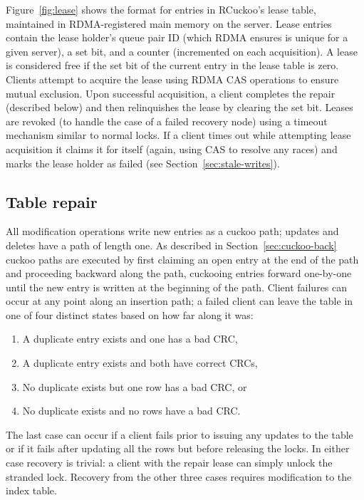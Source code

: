Figure~\ref{fig:lease} shows the format for entries in
RCuckoo's lease table, maintained in RDMA-registered main memory on
the server.  Lease entries contain the lease holder's queue pair ID
(which RDMA ensures is unique for a given server), a set bit, and a
counter (incremented on each acquisition).  A lease is considered free
if the set bit of the current entry in the lease table is zero.
Clients attempt to acquire the lease using RDMA CAS operations to
ensure mutual exclusion.
Upon successful acquisition, a client completes the repair (described
below) and then relinquishes the lease by clearing the set bit.
Leases are revoked (to handle the case of a failed recovery node)
using a timeout mechanism similar to normal locks.  If a client times
out while attempting lease acquisition it claims it for itself (again,
using CAS to resolve any races) and marks the lease holder as failed
(see Section~\ref{sec:stale-writes}).


\subsection{Table repair} 
\label{sec:table-repair}


All modification operations write new entries as a cuckoo path;
updates and deletes have a path of length one.  As described in
Section~\ref{sec:cuckoo-back} cuckoo paths are executed by first
claiming an open entry at the end of the path and proceeding backward
along the path, cuckooing entries forward one-by-one until the new
entry is written at the beginning of the path.  Client failures can
occur at any point along an insertion path; a failed client can leave
the table in one of four distinct states based on how far along it was:
\begin{enumerate}
\item{A duplicate entry exists and one has a bad CRC,}
    \item{A duplicate entry exists and both have correct CRCs,} 
    \item{No duplicate exists but one row has a bad CRC, or}
      \item{No duplicate exists and no rows have a bad CRC.}
\end{enumerate}
\noindent The last case can occur if a client fails prior to issuing
any updates to the table or if it fails after updating all the rows
but before releasing the locks.  In either case recovery is trivial: a
client with the repair lease can simply unlock the stranded lock.
Recovery from the other three cases requires modification to the index
table.


